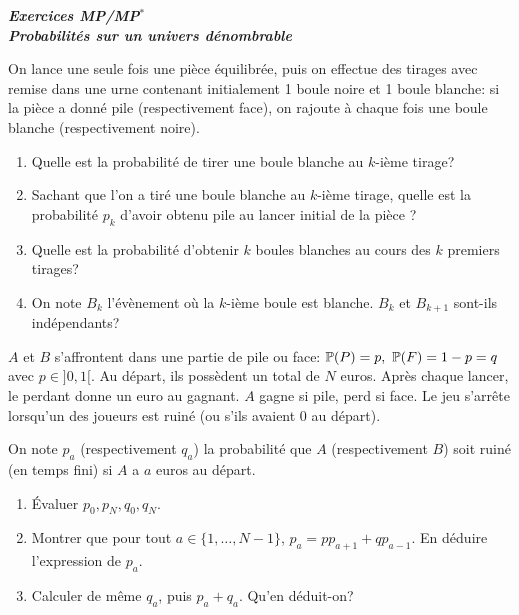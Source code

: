 \documentclass[12pt]{article}
\begin{document}
\begin{titlepage}
	\centering
	\vspace*{\fill}
	\Huge \textit{\textbf{Exercices MP/MP$^*$\\ Probabilités sur un univers dénombrable}}
	\vspace*{\fill}
\end{titlepage}

\begin{exercise}
	On lance une seule fois une pièce équilibrée, puis on effectue des tirages
	avec remise dans une urne contenant initialement 1 boule noire et 1 boule
	blanche: si la pièce a donné pile (respectivement face), on rajoute à chaque
	fois une boule blanche (respectivement noire).
	\begin{enumerate}
		\item
		Quelle est la probabilité de tirer une boule blanche au $k$-ième tirage?
		\item
		Sachant que l'on a tiré une boule blanche au $k$-ième tirage, quelle est
		la probabilité $p_{k}$ d'avoir obtenu pile au lancer initial de la pièce ?
		\item
		Quelle est la probabilité d'obtenir $k$ boules blanches au cours des $k$
		premiers tirages?
		\item
		On note $B_{k}$ l'évènement où la $k$-ième boule est blanche. $B_{k}$ et
		$B_{k+1}$ sont-ils indépendants?
	\end{enumerate}
\end{exercise}

\begin{exercise}
	$A$ et $B$ s'affrontent dans une partie de pile ou face:
	$\P(P)=p,~\P(F)=1-p=q$ avec $p\in]0,1[$. Au départ, ils possèdent un total de
	$N$ euros. Après chaque lancer, le perdant donne un euro au gagnant. $A$ gagne
	si pile, perd si face. Le jeu s'arrête lorsqu'un des joueurs est ruiné (ou
	s'ils avaient 0 au départ).

	On note $p_{a}$ (respectivement $q_{a}$) la probabilité que $A$
	(respectivement $B$) soit ruiné (en temps fini) si $A$ a $a$ euros au départ.
	\begin{enumerate}
		\item
		Évaluer $p_{0},p_{N},q_{0},q_{N}$.
		\item
		Montrer que pour tout $a\in\{1,\dots,N-1\}$, $p_{a}=pp_{a+1}+qp_{a-1}$. En
		déduire l'expression de $p_{a}$.
		\item
		Calculer de même $q_{a}$, puis $p_{a}+q_{a}$. Qu'en déduit-on?
	\end{enumerate}
\end{exercise}
\end{document}
